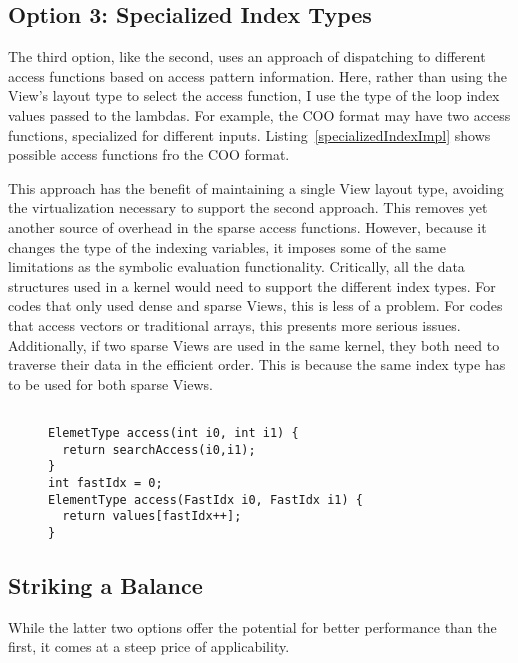 \subsection{Option 3: Specialized Index Types}
The third option, like the second, uses an approach of dispatching to different access functions based on access pattern information.
Here, rather than using the View's layout type to select the access function, I use the type of the loop index values passed to the lambdas.
For example, the COO format may have two access functions, specialized for different inputs.
Listing~\ref{specializedIndexImpl} shows possible access functions fro the COO format.

This approach has the benefit of maintaining a single View layout type, avoiding the virtualization necessary to support the second approach.
This removes yet another source of overhead in the sparse access functions.
However, because it changes the type of the indexing variables, it imposes some of the same limitations as the symbolic evaluation functionality. 
Critically, all the data structures used in a kernel would need to support the different index types. 
For codes that only used dense and sparse Views, this is less of a problem.
For codes that access vectors or traditional arrays, this presents more serious issues.
Additionally, if two sparse Views are used in the same kernel, they both need to traverse their data in the efficient order.
This is because the same index type has to be used for both sparse Views.


\begin{figure}
\begin{lstlisting}[caption={Reference implementation for the Specialized Index Types approach.}, label=specializedIndexImp]

ElemetType access(int i0, int i1) {
  return searchAccess(i0,i1);
}
int fastIdx = 0;
ElementType access(FastIdx i0, FastIdx i1) {
  return values[fastIdx++];
}
\end{lstlisting}
\end{figure}

\subsection{Striking a Balance}
While the latter two options offer the potential for better performance than the first, it comes at a steep price of applicability.

